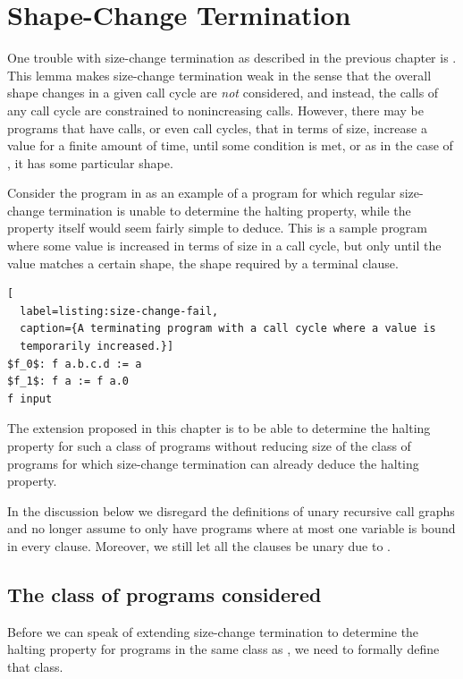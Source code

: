 \chapter{Shape-Change Termination}

One trouble with size-change termination as described in the previous chapter
is . This lemma makes size-change termination weak
in the sense that the overall shape changes in a given call cycle are
\emph{not} considered, and instead, the calls of any call cycle are constrained
to nonincreasing calls. However, there may be programs that have calls, or even
call cycles, that in terms of size, increase a value for a finite amount of
time, until some condition is met, or as in the case of \D{}, it has some
particular shape.

Consider the program in  as an example of a
program for which regular size-change termination is unable to determine the
halting property, while the property itself would seem fairly simple to deduce.
This is a sample program where some value is increased in terms of size in a
call cycle, but only until the value matches a certain shape, the shape
required by a terminal clause.

\begin{lstlisting}[
  label=listing:size-change-fail,
  caption={A terminating program with a call cycle where a value is
  temporarily increased.}]
$f_0$: f a.b.c.d := a
$f_1$: f a := f a.0
f input
\end{lstlisting}

The extension proposed in this chapter is to be able to determine the halting
property for such a class of programs without reducing size of the class of
programs for which size-change termination can already deduce the halting
property.

In the discussion below we disregard the definitions of unary recursive call
graphs and no longer assume to only have programs where at most one variable is
bound in every clause. Moreover, we still let all the clauses be unary due to
. 

\section{The class of programs considered}

Before we can speak of extending size-change termination to determine the
halting property for programs in the same class as
, we need to formally define that class.

